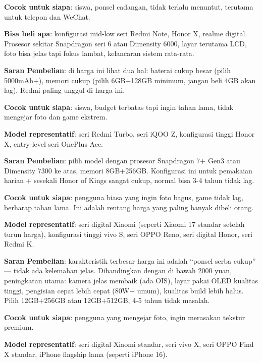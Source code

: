 \textbf{Cocok untuk siapa}: siswa, ponsel cadangan, tidak terlalu menuntut, terutama untuk telepon dan WeChat.

\textbf{Bisa beli apa}: konfigurasi mid-low seri Redmi Note, Honor X, realme digital. Prosesor sekitar Snapdragon seri 6 atau Dimensity 6000, layar terutama LCD, foto bisa jelas tapi fokus lambat, kelancaran sistem rata-rata.

\textbf{Saran Pembelian}: di harga ini lihat dua hal: baterai cukup besar (pilih 5000mAh+), memori cukup (pilih 6GB+128GB minimum, jangan beli 4GB akan lag). Redmi paling unggul di harga ini.


\textbf{Cocok untuk siapa}: siswa, budget terbatas tapi ingin tahan lama, tidak mengejar foto dan game ekstrem.

\textbf{Model representatif}: seri Redmi Turbo, seri iQOO Z, konfigurasi tinggi Honor X, entry-level seri OnePlus Ace.

\textbf{Saran Pembelian}: pilih model dengan prosesor Snapdragon 7+ Gen3 atau Dimensity 7300 ke atas, memori 8GB+256GB. Konfigurasi ini untuk pemakaian harian + sesekali Honor of Kings sangat cukup, normal bisa 3-4 tahun tidak lag.


\textbf{Cocok untuk siapa}: pengguna biasa yang ingin foto bagus, game tidak lag, berharap tahan lama. Ini adalah rentang harga yang paling banyak dibeli orang.

\textbf{Model representatif}: seri digital Xiaomi (seperti Xiaomi 17 standar setelah turun harga), konfigurasi tinggi vivo S, seri OPPO Reno, seri digital Honor, seri Redmi K.

\textbf{Saran Pembelian}: karakteristik terbesar harga ini adalah “ponsel serba cukup” — tidak ada kelemahan jelas. Dibandingkan dengan di bawah 2000 yuan, peningkatan utama: kamera jelas membaik (ada OIS), layar pakai OLED kualitas tinggi, pengisian cepat lebih cepat (80W+ umum), kualitas build lebih halus. Pilih 12GB+256GB atau 12GB+512GB, 4-5 tahun tidak masalah.


\textbf{Cocok untuk siapa}: pengguna yang mengejar foto, ingin merasakan tekstur premium.

\textbf{Model representatif}: seri digital Xiaomi standar, seri vivo X, seri OPPO Find X standar, iPhone flagship lama (seperti iPhone 16).

